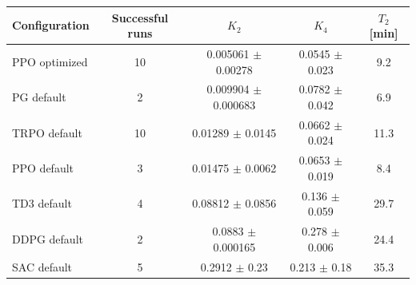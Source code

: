 \begin{tabular}{lcccc}
\toprule
Configuration & Successful runs & $K_2$ & $K_4$ & $T_2$ [min] \\
\midrule
PPO optimized & 10 & 0.005061 $\pm$ 0.00278 & 0.0545 $\pm$ 0.023 & 9.2 \\
PG default & 2 & 0.009904 $\pm$ 0.000683 & 0.0782 $\pm$ 0.042 & 6.9 \\
TRPO default & 10 & 0.01289 $\pm$ 0.0145 & 0.0662 $\pm$ 0.024 & 11.3 \\
PPO default & 3 & 0.01475 $\pm$ 0.0062 & 0.0653 $\pm$ 0.019 & 8.4 \\
TD3 default & 4 & 0.08812 $\pm$ 0.0856 & 0.136 $\pm$ 0.059 & 29.7 \\
DDPG default & 2 & 0.0883 $\pm$ 0.000165 & 0.278 $\pm$ 0.006 & 24.4 \\
SAC default & 5 & 0.2912 $\pm$ 0.23 & 0.213 $\pm$ 0.18 & 35.3 \\
\bottomrule
\end{tabular}

